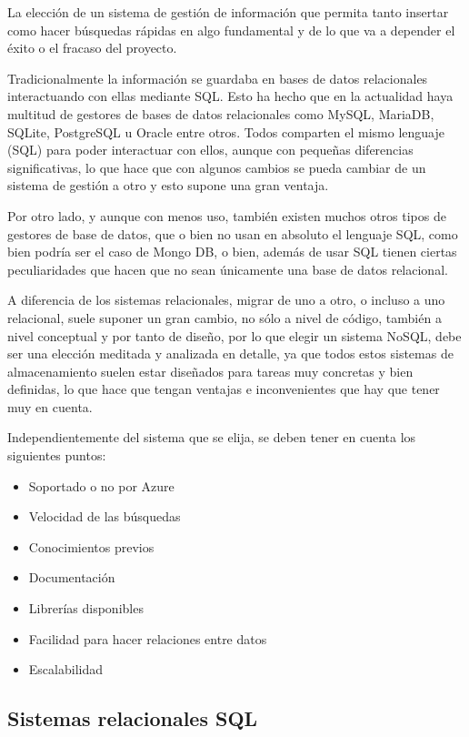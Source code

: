 La elección de un sistema de gestión de información que permita tanto insertar como hacer búsquedas rápidas en algo fundamental y de lo que va a depender el éxito o el fracaso del proyecto.

Tradicionalmente la información se guardaba en bases de datos relacionales interactuando con ellas mediante SQL. Esto ha hecho que en la actualidad haya multitud de gestores de bases de datos relacionales como MySQL\cite{MySQL}, MariaDB\cite{MariaDB}, SQLite\cite{SQLite}, PostgreSQL\cite{PostgreSQL} u Oracle\cite{Oracle} entre otros. Todos comparten el mismo lenguaje (SQL) para poder interactuar con ellos, aunque con pequeñas diferencias significativas, lo que hace que con algunos cambios se pueda cambiar de un sistema de gestión a otro y esto supone una gran ventaja.

Por otro lado, y aunque con menos uso, también existen muchos otros tipos de gestores de base de datos, que o bien no usan en absoluto el lenguaje SQL, como bien podría ser el caso de Mongo DB\cite{MongoDB}, o bien, además de usar SQL tienen ciertas peculiaridades que hacen que no sean únicamente una base de datos relacional. 

A diferencia de los sistemas relacionales, migrar de uno a otro, o incluso a uno relacional, suele suponer un gran cambio, no sólo a nivel de código, también a nivel conceptual y por tanto de diseño, por lo que elegir un sistema NoSQL, debe ser una elección meditada y analizada en detalle, ya que todos estos sistemas de almacenamiento suelen estar diseñados para tareas muy concretas y bien definidas, lo que hace que tengan ventajas e inconvenientes que hay que tener muy en cuenta.

Independientemente del sistema que se elija, se deben tener en cuenta los siguientes puntos:

\begin{itemize}
    \item Soportado o no por Azure
    \item Velocidad de las búsquedas
    \item Conocimientos previos
    \item Documentación
    \item Librerías disponibles 
    \item Facilidad para hacer relaciones entre datos
    \item Escalabilidad
\end{itemize}

\subsection{Sistemas relacionales SQL}

